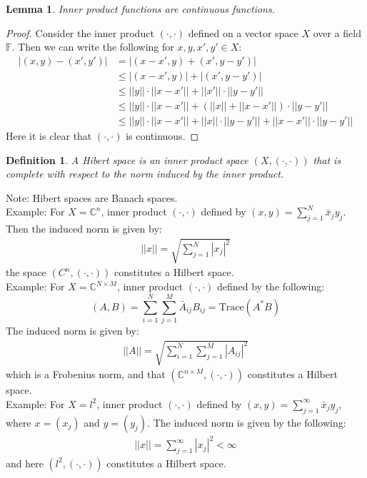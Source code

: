 \documentclass[11pt]{book}
\theoremstyle{break}
\theoremstyle{break}
\newtheorem{lem}{Lemma}[thm]
\newtheorem{defn}{Definition}[corL]
\newcommand{\C}{\mathbb{C}}
\newcommand{\note}{\color{red}Note: \color{black}}
\newcommand{\example}{\color{green}Example: \color{black}}
\begin{document}
\begin{lem}
Inner product functions are continuous functions. 
\end{lem}
\begin{proof}
Consider the inner product $(\cdot ,\cdot)$ defined on a vector space $X$ over a field $\mathbb{F}$. Then we can write the following for $x,y,x',y' \in X$:
\begin{align*}
|(x,y) - (x',y')| &= |(x-x',y) + (x',y-y')|\\
&\leq |(x-x',y)| + |(x',y-y')|\\
&\leq ||y||\cdot ||x-x'|| + ||x'||\cdot ||y-y'||\\
&\leq ||y||\cdot ||x-x'|| + \left( ||x|| + ||x-x'||\right)\cdot ||y-y'||\\
&\leq ||y||\cdot ||x-x'|| + ||x||\cdot ||y-y'|| + ||x- x'||\cdot ||y-y'||
\end{align*}
Here it is clear that $(\cdot, \cdot)$ is continuous. 
\end{proof}

\begin{defn}
A Hibert space is an inner product space $(X,(\cdot, \cdot))$ that is complete with respect to the norm induced by the inner product. 
\end{defn}

\note Hibert spaces are Banach spaces.\\

\newpage
\example For $X = \C^n$, inner product $(\cdot, \cdot)$ defined by $(x,y) = \sum_{j=1}^N \bar{x}_j y_j$. Then the induced norm is given by:
\begin{align*}
||x|| = \sqrt{\sum_{j=1}^N |x_j|^2}
\end{align*}
the space $(C^n, (\cdot, \cdot))$ constitutes a Hilbert space.\\

\example
For $X = \C^{N\times M}$, inner product $(\cdot, \cdot)$ defined by the following:
$$(A,B) = \sum_{i=1}^N\sum_{j=1}^M \bar{A}_{ij}B_{ij} = \text{Trace}(A^*B)$$ 
The induced norm is given by:
\begin{align*}
||A || = \sqrt{\sum_{i=1}^N \sum_{j=1}^M |A_{ij}|^2}
\end{align*}
which is a Frobenius norm, and that $(\C^{n\times M}, (\cdot, \cdot))$ constitutes a Hilbert space.\\



\example
For $X =l^2$, inner product $(\cdot, \cdot)$ defined by $(x,y) = \sum_{j=1}^\infty \bar{x}_j y_j$, where $x = (x_j)$ and $y = (y_j)$. The induced norm is given by the following:
\begin{align*}
||x || = \sum_{j=1}^\infty |x_j|^2 < \infty
\end{align*}
and here $(l^2, (\cdot, \cdot))$ constitutes a Hilbert space. \\
\end{document}
